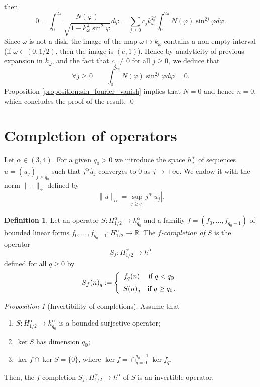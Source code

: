 \documentclass[12pt, openany]{amsart}
\theoremstyle{definition}
\newtheorem{definition}[theorem]{Definition}
\theoremstyle{remark}
\theoremstyle{remark}
\theoremstyle{theorem}
\theoremstyle{theorem}
\theoremstyle{theorem}
\newtheorem{proposition}[theorem]{Proposition}
\theoremstyle{theorem}
\newcommand{\RR}{\mathbb{R}}
\begin{document}
then
\[
0 = \int_0^{2\pi}\frac{N(\varphi)} 
{\sqrt{1-k_{\omega}^2\sin^2\varphi}}d\varphi = \sum_{j\geq 0}c_jk_{\omega}^{2j} \int_0^{2\pi} N(\varphi)\sin^{2j}\varphi d\varphi.
\]
Since $\omega$ is not a disk, the image of the map $\omega\mapsto k_{\omega}$ contains a non empty interval
(if $\omega \in (0,1/2)$, then the image is $(e,1)$). 
Hence by analyticity of previous expansion in $k_{\omega}$, and the fact that $c_j\neq 0$ for all $j\geq 0$, we deduce that
\[
\forall j\geq 0\qquad \int_0^{2\pi} N(\varphi)\sin^{2j}\varphi d\varphi = 0.
\]
Proposition \ref{proposition:sin_fourier_vanish} implies that $N=0$ and hence $n=0$, which concludes the proof of the result.
\qed



\section{Completion of operators}
\label{section:operator_completion}

Let $\alpha\in(3,4)$. For a given $q_0>0$ we introduce the space $h^{\alpha}_{q_0}$ of sequences $u=(u_j)_{j\geq q_0}$ such that 
$j^{\alpha}\widehat u_{j}$ converges to $0$ {as $j\to +\infty$}. We endow it with the norm $\|\cdot\|_{\alpha}$ defined by
\[
\|u\|_{\alpha} = \sup_{j\geq q_0} j^{\alpha}|u_{j}|.
\]

\begin{definition}
\label{definition:completion}
Let an operator $S:H^{\alpha}_{1/2}\to h^{\alpha}_{q_0}$ and a familiy $f=(f_0,\ldots,f_{q_0-1})$ of bounded linear forms $f_0,\ldots,f_{q_0-1}: H^{\alpha}_{1/2}\to\RR$. The \textit{$f$-completion of $S$} is the operator 
\[
S_f:H^{\alpha}_{1/2}\to h^{\alpha}
\]
defined for all $q\geq 0$ by 
\begin{equation}
S_f(n)_q := \left\{
\begin{array}{cc}\vspace*{0.2cm}
f_q(n) & \text{if }q<q_0\\
S(n)_q & \text{if }q\geq q_0.
\end{array}
\right.
\end{equation}
\end{definition}

\begin{proposition}[Invertibility of completions]
\label{proposition:invertibility_completion}
Assume that 
\begin{enumerate}
\item $S:H^{\alpha}_{1/2}\to h^{\alpha}_{q_0}$ is a bounded surjective operator;
\item $\ker S$ has dimension $q_0$;
\item $\ker f\cap\ker S=\{0\}$, where $\ker f = \cap_{q=0}^{q_0-1} \ker f_q$.
\end{enumerate}
Then, the $f$-completion $S_f:H^{\alpha}_{1/2}\to h^{\alpha}$ of $S$ is an invertible operator.
\end{proposition}
\end{document}

